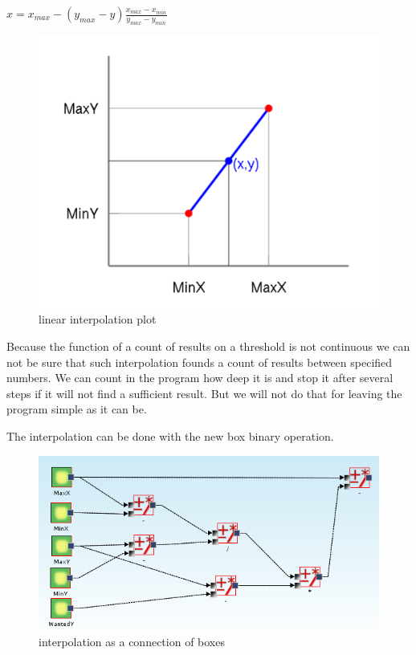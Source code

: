 \documentclass[a4paper,12pt]{book}
\begin{document}
\begin{math}
x = x_{max} - (y_{max} - y)\frac{x_{max} - x_{min}}{y_{max} - y_{min}}
\end{math}
\begin{figure}
	\includegraphics[width=13.72cm]{linearInterpolationPlot}
	\caption{linear interpolation plot}
\end{figure}

Because the function of a count of results on a threshold is not continuous we can not be sure that such interpolation founds a count of results between specified numbers. We can count in the program how deep it is and stop it after several steps if it will not find a sufficient result. But we will not do that for leaving the program simple as it can be.

The interpolation can be done with the new box binary operation. 
\begin{figure}
	\includegraphics[width=13.72cm]{linearInterpolation}
	\caption{interpolation as a connection of boxes}
\end{figure}
\end{document}

